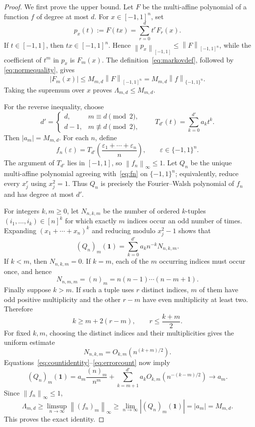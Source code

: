 \documentclass[11pt]{article}
\newcommand{\cube}{\{-1,1\}}
\newcommand{\norm}[1]{\left\lVert#1\right\rVert}
\begin{document}
\begin{proof}
We first prove the upper bound.  Let $F$ be the multi-affine polynomial of a
function $f$ of degree at most $d$.  For $x\in[-1,1]^n$, set
\[
 p_x(t):=F(tx)=\sum_{r=0}^d t^rF_r(x).
\]
If $t\in[-1,1]$, then $tx\in[-1,1]^n$.  Hence
$\norm{p_x}_{[-1,1]}\le\norm F_{[-1,1]^n}$, while the coefficient of $t^m$
in $p_x$ is $F_m(x)$.  The definition~\eqref{eq:markovdef}, followed by
\eqref{eq:normequality}, gives
\[
 |F_m(x)|\le M_{m,d}\norm F_{[-1,1]^n}
              =M_{m,d}\norm f_{\cube^n}.
\]
Taking the supremum over $x$ proves $\Lambda_{m,d}\le M_{m,d}$.

For the reverse inequality, choose
\[
 d'=\begin{cases}d,&m\equiv d\pmod2,\\d-1,&m\not\equiv d\pmod2,
 \end{cases}
 \qquad
 T_{d'}(t)=\sum_{k=0}^{d'}a_kt^k.
\]
Then $|a_m|=M_{m,d}$.  For each $n$, define
\begin{equation}\label{eq:fn}
 f_n(\varepsilon)=T_{d'}\!\left(
           \frac{\varepsilon_1+\cdots+\varepsilon_n}{n}\right),
 \qquad \varepsilon\in\cube^n.
\end{equation}
The argument of $T_{d'}$ lies in $[-1,1]$, so $\norm{f_n}_\infty\le1$.
Let $Q_n$ be the unique multi-affine polynomial agreeing with~\eqref{eq:fn}
on $\cube^n$; equivalently, reduce every $x_j^r$ using $x_j^2=1$.
Thus $Q_n$ is precisely the Fourier--Walsh polynomial of $f_n$ and has degree
at most $d'$.

For integers $k,m\ge0$, let $N_{n,k,m}$ be the number of ordered $k$-tuples
$(i_1,\ldots,i_k)\in[n]^k$ for which exactly $m$ indices occur an odd number
of times.  Expanding $(x_1+\cdots+x_n)^k$ and reducing modulo
$x_j^2-1$ shows that
\begin{equation}\label{eq:countidentity}
 (Q_n)_m(\mathbf1)=\sum_{k=0}^{d'}a_kn^{-k}N_{n,k,m}.
\end{equation}
If $k<m$, then $N_{n,k,m}=0$.  If $k=m$, each of the $m$ occurring indices
must occur once, and hence
\begin{equation}\label{eq:maincount}
 N_{n,m,m}=(n)_m=n(n-1)\cdots(n-m+1).
\end{equation}
Finally suppose $k>m$.  If such a tuple uses $r$ distinct indices, $m$ of
them have odd positive multiplicity and the other $r-m$ have even
multiplicity at least two.  Therefore
\[
 k\ge m+2(r-m),\qquad r\le\frac{k+m}{2}.
\]
For fixed $k,m$, choosing the distinct indices and their multiplicities gives
the uniform estimate
\begin{equation}\label{eq:errorcount}
 N_{n,k,m}=O_{k,m}\!\left(n^{(k+m)/2}\right).
\end{equation}
Equations~\eqref{eq:countidentity}--\eqref{eq:errorcount} now imply
\[
 (Q_n)_m(\mathbf1)
 =a_m\frac{(n)_m}{n^m}
  +\sum_{k=m+1}^{d'}a_kO_{k,m}\!\left(n^{-(k-m)/2}\right)
 \longrightarrow a_m.
\]
Since $\norm{f_n}_\infty\le1$,
\[
 \Lambda_{m,d}\ge\limsup_{n\to\infty}
   \norm{(f_n)_m}_\infty
 \ge\lim_{n\to\infty}|(Q_n)_m(\mathbf1)|
 =|a_m|=M_{m,d}.
\]
This proves the exact identity.


\end{proof}
\end{document}
